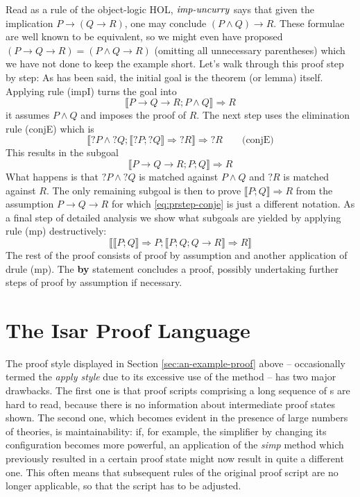 Read as a rule of the object-logic HOL, $\mbox{\emph{imp-uncurry}}$ says that given
the implication $P \longrightarrow (Q \longrightarrow R)$, one may conclude $(P\land Q) \longrightarrow R$. These formulae are
well known to be equivalent, so we might even have proposed $(P \longrightarrow Q \longrightarrow R) = (P \land
Q \longrightarrow R)$ (omitting all unnecessary parentheses) which we have not done to keep
the example short. Let's walk through this proof
step by step: As has been said, the initial goal is the theorem (or lemma)
itself. Applying rule (impI) turns the goal into
\[
\llbracket P\longrightarrow Q\longrightarrow R; P\land Q\rrbracket \Longrightarrow R
\]
\IE it assumes $P\land Q$ and imposes the proof of $R$. The next step uses the
elimination rule (conjE) which is
\[
\llbracket{?P} \land {?Q}; \llbracket{?P}; {?Q}\rrbracket \Longrightarrow {?R}\rrbracket \Longrightarrow {?R}\qquad \text{(conjE)}
\]
This results in the subgoal
\begin{equation} \label{eq:prstep-conje}
\llbracket P\longrightarrow Q\longrightarrow R; P; Q\rrbracket \Longrightarrow R
\end{equation}
What happens is that ${?P} \land {?Q}$ is matched against $P \land Q$ and ${?R}$ is
matched against $R$. The only remaining subgoal is then to prove $\llbracket P; Q\rrbracket\Longrightarrow R$ from
the assumption $P\longrightarrow Q\longrightarrow R$ for which \eqref{eq:prstep-conje} is just a different
notation. As a final step of detailed analysis we show what subgoals are yielded
by applying rule (mp) destructively:
\[
\llbracket \llbracket P; Q\rrbracket \Longrightarrow P; \llbracket P; Q; Q \longrightarrow R\rrbracket \Longrightarrow R\rrbracket
\] 
The rest of the proof consists of proof by assumption and another application of
drule (mp). The \textbf{by} statement concludes a proof, possibly undertaking
further steps of proof by assumption if necessary.


\section{The Isar Proof Language}
\label{sec:isar-proof-language}

The proof style displayed in Section \ref{sec:an-example-proof} above --
occasionally termed the \emph{apply style} due to its excessive use of the
 method -- has two major drawbacks. The first one is that
proof scripts comprising a long sequence of s are hard to
read, because there is no information about intermediate proof states shown.
The second one, which becomes evident in the presence of large numbers of
theories, is maintainability: if, for example, the simplifier by changing its
configuration becomes more powerful, an application of the \emph{simp} method which
previously resulted in a certain proof state might now result in quite a
different one. This often means that subsequent rules of the original proof
script are no longer applicable, so that the script has to be adjusted.

